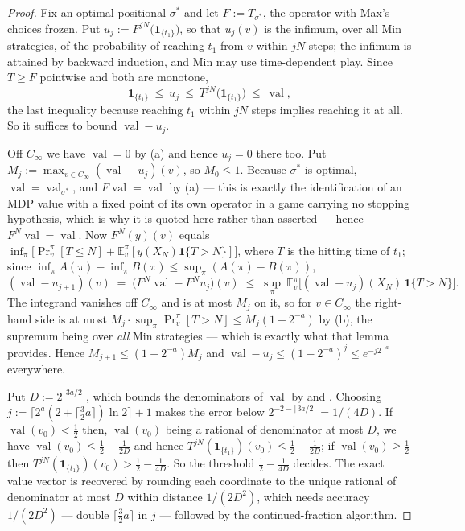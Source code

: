 \documentclass[11pt]{article}
\theoremstyle{plain}
\theoremstyle{definition}
\DeclareMathOperator{\val}{val}
\newcommand{\bbone}{\mathbf{1}}
\begin{document}
\begin{proof}
Fix an optimal positional $\sigma^\ast$ and let $F:=T_{\sigma^\ast}$, the
operator with Max's choices frozen. Put
$u_j:=F^{jN}\bigl(\bbone_{\{t_1\}}\bigr)$, so that $u_j(v)$ is the
infimum, over all Min strategies, of the probability of reaching $t_1$
from $v$ within $jN$ steps; the infimum is attained by backward
induction, and Min may use time-dependent play. Since $T\ge F$ pointwise
and both are monotone,
\[
  \bbone_{\{t_1\}}\ \le\ u_j\ \le\ T^{jN}\bigl(\bbone_{\{t_1\}}\bigr)\ \le\ \val,
\]
the last inequality because reaching $t_1$ within $jN$ steps implies
reaching it at all. So it suffices to bound $\val-u_j$.

Off $C_\infty$ we have $\val=0$ by (a) and hence
$u_j=0$ there too. Put $M_j:=\max_{v\in C_\infty}(\val-u_j)(v)$, so
$M_0\le1$. Because $\sigma^\ast$ is optimal, $\val=\val_{\sigma^\ast}$, and
$F\val=\val$ by (a) --- this is exactly the
identification of an MDP value with a fixed point of its own operator in
a game carrying no stopping hypothesis, which is why it is quoted here
rather than asserted --- hence $F^{N}\val=\val$. Now $F^{N}(y)(v)$ equals
$\inf_\pi\bigl[\Pr^{\pi}_v[T\le N]+\mathbb{E}^{\pi}_v[y(X_N)\mathbf1\{T>N\}]\bigr]$,
where $T$ is the hitting time of $t_1$; since
$\inf_\pi A(\pi)-\inf_\pi B(\pi)\le\sup_\pi(A(\pi)-B(\pi))$,
\[
  (\val-u_{j+1})(v)\;=\;\bigl(F^{N}\val-F^{N}u_j\bigr)(v)
  \;\le\;\sup_\pi\ \mathbb{E}^{\pi}_v\bigl[(\val-u_j)(X_N)\,\mathbf1\{T>N\}\bigr].
\]
The integrand vanishes off $C_\infty$ and is at most $M_j$ on it, so for
$v\in C_\infty$ the right-hand side is at most
$M_j\cdot\sup_\pi\Pr^{\pi}_v[T>N]\le M_j(1-2^{-a})$ by
(b), the supremum being over \emph{all} Min strategies
--- which is exactly what that lemma provides. Hence
$M_{j+1}\le(1-2^{-a})M_j$ and $\val-u_j\le(1-2^{-a})^{j}\le e^{-j2^{-a}}$
everywhere.

Put $D:=2^{\lceil 3a/2\rceil}$, which bounds the denominators of $\val$ by
 and . Choosing
$j:=\bigl\lceil 2^{a}(2+\lceil\tfrac32a\rceil)\ln2\bigr\rceil+1$ makes the
error below $2^{-2-\lceil 3a/2\rceil}=1/(4D)$. If $\val(v_0)<\tfrac12$
then, $\val(v_0)$ being a rational of denominator at most $D$, we have
$\val(v_0)\le\tfrac12-\tfrac1{2D}$ and hence
$T^{jN}(\bbone_{\{t_1\}})(v_0)\le\tfrac12-\tfrac1{2D}$; if
$\val(v_0)\ge\tfrac12$ then
$T^{jN}(\bbone_{\{t_1\}})(v_0)>\tfrac12-\tfrac1{4D}$. So the threshold
$\tfrac12-\tfrac1{4D}$ decides. The exact value vector is recovered by
rounding each coordinate to the unique rational of denominator at most
$D$ within distance $1/(2D^{2})$, which needs accuracy $1/(2D^2)$ ---
double $\lceil\tfrac32a\rceil$ in $j$ --- followed by the
continued-fraction algorithm.


\end{proof}
\end{document}
